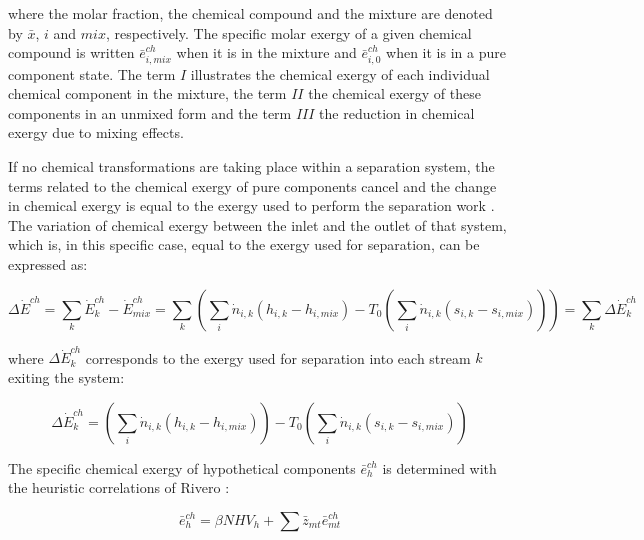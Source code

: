 	where the molar fraction, the chemical compound and the mixture are denoted by $\bar{x}$, $i$ and $mix$, respectively. The specific molar exergy of a given chemical compound is written $\bar{e}^{ch}_{i,mix}$ when it is in the mixture and $\bar{e}^{ch}_{i,0}$ when it is in a pure component state. The term $I$ illustrates the chemical exergy of each individual chemical component in the mixture, the term $II$ the chemical exergy of these components in an unmixed form and the term $III$ the reduction in chemical exergy due to mixing effects.  


If no chemical transformations are taking place within a separation system, the terms related to the chemical exergy of pure components cancel and the change in chemical exergy is equal to the exergy used to perform the separation work \cite{Kotas1995}. The variation of chemical exergy between the inlet and the outlet of that system, which is, in this specific case, equal to the exergy used for separation, can be expressed as:

\begin{equation}
\Delta \dot{E}^{ch} = \sum_k \dot{E}^{ch}_k-\dot{E}^{ch}_{mix} = \sum_k \left( \sum_i \dot{n}_{i,k} \left(h_{i,k}-h_{i,mix}\right)-T_0\left(\sum_i \dot{n}_{i,k}\left(s_{i,k}-s_{i,mix}\right)\right)\right) = \sum_k \Delta \dot{E}^{ch}_k
\end{equation}

	where $\Delta \dot{E}^{ch}_k$ corresponds to the exergy used for separation into each stream $k$ exiting the system:

\begin{equation}
\Delta \dot{E}^{ch}_k = \left(\sum_i \dot{n}_{i,k} \left(h_{i,k}-h_{i,mix}\right)\right)-T_0\left(\sum_i \dot{n}_{i,k}\left(s_{i,k}-s_{i,mix}\right)\right)
\end{equation}	

The specific chemical exergy of hypothetical components $\bar{e}^{ch}_h$ is determined with the heuristic correlations of Rivero \cite{Rivero1999}:
	
\begin{equation}
	\bar{e}^{ch}_h=\beta NHV_h+\sum \bar{z}_{mt} \bar{e}^{ch}_{mt}
\end{equation}
	
	
